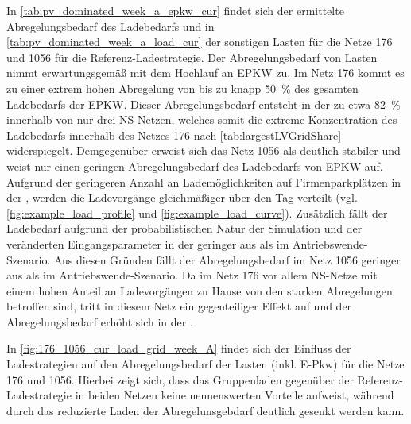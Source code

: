 In \autoref{tab:pv_dominated_week_a_epkw_cur} findet sich der ermittelte Abregelungsbedarf des Ladebedarfs und in \autoref{tab:pv_dominated_week_a_load_cur} der sonstigen Lasten für die Netze \num{176} und \num{1056} für die Referenz-Ladestrategie.
Der Abregelungsbedarf von Lasten nimmt erwartungsgemäß mit dem Hochlauf an \gls{EPKW} zu.
Im Netz \num{176} kommt es zu einer extrem hohen Abregelung von bis zu knapp \SI{50}{\percent} des gesamten Ladebedarfs der \gls{EPKW}.
Dieser Abregelungsbedarf entsteht in der \SzeFirmenparkplatz zu etwa \SI{82}{\percent} innerhalb von nur drei \gls{NS}-Netzen, welches somit die extreme Konzentration des Ladebedarfs innerhalb des Netzes \num{176} nach \autoref{tab:largestLVGridShare} widerspiegelt.
Demgegenüber erweist sich das Netz \num{1056} als deutlich stabiler und weist nur einen geringen Abregelungsbedarf des Ladebedarfs von \gls{EPKW} auf.
Aufgrund der geringeren Anzahl an Lademöglichkeiten auf Firmenparkplätzen in der \SzeFirmenparkplatzdot, werden die Ladevorgänge gleichmäßiger über den Tag verteilt (vgl. \autoref{fig:example_load_profile} und \autoref{fig:example_load_curve}).
Zusätzlich fällt der Ladebedarf aufgrund der probabilistischen Natur der Simulation und der veränderten Eingangsparameter in der \SzeFirmenparkplatz geringer aus als im Antriebswende-Szenario.
Aus diesen Gründen fällt der Abregelungsbedarf im Netz \num{1056} geringer aus als im Antriebswende-Szenario.
Da im Netz \num{176} vor allem \gls{NS}-Netze mit einem hohen Anteil an Ladevorgängen zu Hause von den starken Abregelungen betroffen sind, tritt in diesem Netz ein gegenteiliger Effekt auf und der Abregelungsbedarf erhöht sich in der \SzeFirmenparkplatzdot.





In \autoref{fig:176_1056_cur_load_grid_week_A} findet sich der Einfluss der Ladestrategien auf den Abregelungsbedarf der Lasten (inkl. E-Pkw) für die Netze \num{176} und \num{1056}.
Hierbei zeigt sich, dass das Gruppenladen gegenüber der Referenz-Ladestrategie in beiden Netzen keine nennenswerten Vorteile aufweist, während durch das reduzierte Laden der Abregelunsgebdarf deutlich gesenkt werden kann.



